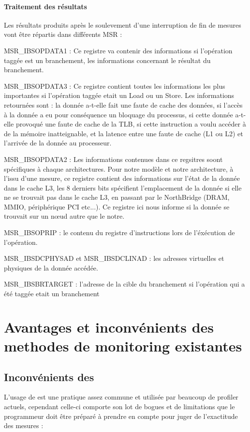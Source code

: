 			\paragraph{Traitement des résultats}
				Les résultats produits après le soulevement d'une interruption de fin de mesures vont être répartis dans différents MSR : 
				\bitem
					\item{MSR\_IBSOPDATA1 : Ce registre va contenir des informations si l'opération taggée est un branchement, les informations concernant le résultat du branchement.}
					\item{MSR\_IBSOPDATA3 : Ce registre contient toutes les informations les plus importantes si l'opération taggée etait un Load ou un Store. Les informations retournées sont : la donnée a-t-elle fait une faute de cache des données, si l'accès à la donnée a eu pour conséquence un bloquage du processus, si cette donnée a-t-elle provoqué une faute de cache de la TLB, si cette instruction a voulu accéder à de la mémoire inatteignable, et la latence entre une faute de cache (L1 ou L2) et l'arrivée de la donnée au processeur.}
					\item{MSR\_IBSOPDATA2 : Les informations contenues dans ce regsitres soont spécifiques à chaque architectures. Pour notre modèle et notre architecture, à l'issu d'une mesure, ce registre contient des informations sur l'état de la donnée dans le cache L3, les 8 derniers bits spécifient l'emplacement de la donnée si elle ne se trouvait pas dans le cache L3, en passant par le NorthBridge (DRAM, MMIO, périphérique PCI etc...). Ce registre ici nous informe si la donnée se trouvait sur un n\oe ud autre que le notre.}
					\item{MSR\_IBSOPRIP : le contenu du registre d'instructions lors de l'éxécution de l'opération.}
					\item{MSR\_IBSDCPHYSAD et MSR\_IBSDCLINAD : les adresses virtuelles et physiques de la donnée accédée.}
					\item{MSR\_IBSBRTARGET : l'adresse de la cible du branchement si l'opération qui a été taggée etait un branchement}
				\eitem
			\section{Avantages et inconvénients des methodes de monitoring existantes}
				\subsection{Inconvénients des \PMC}
					L'usage de \PMC est une pratique assez commune et utilisée par beaucoup de profiler actuels, cependant celle-ci comporte son lot de bogues et de limitations que le programmeur doit être préparé à prendre en compte pour juger de l'exactitude des mesures :
